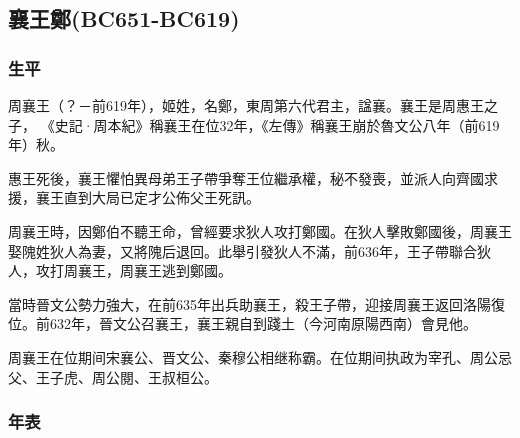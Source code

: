 
\subsection{襄王鄭\tiny{(BC651-BC619)}}

\subsubsection{生平}

周襄王（？－前619年），姬姓，名鄭，東周第六代君主，諡襄。襄王是周惠王之子， 《史記·周本紀》稱襄王在位32年，《左傳》稱襄王崩於魯文公八年（前619年）秋。

惠王死後，襄王懼怕異母弟王子帶爭奪王位繼承權，秘不發喪，並派人向齊國求援，襄王直到大局已定才公佈父王死訊。

周襄王時，因鄭伯不聽王命，曾經要求狄人攻打鄭國。在狄人擊敗鄭國後，周襄王娶隗姓狄人為妻，又將隗后退回。此舉引發狄人不滿，前636年，王子帶聯合狄人，攻打周襄王，周襄王逃到鄭國。

當時晉文公勢力強大，在前635年出兵助襄王，殺王子帶，迎接周襄王返回洛陽復位。前632年，晉文公召襄王，襄王親自到踐土（今河南原陽西南）會見他。

周襄王在位期间宋襄公、晋文公、秦穆公相继称霸。在位期间执政为宰孔、周公忌父、王子虎、周公閱、王叔桓公。

\subsubsection{年表}

